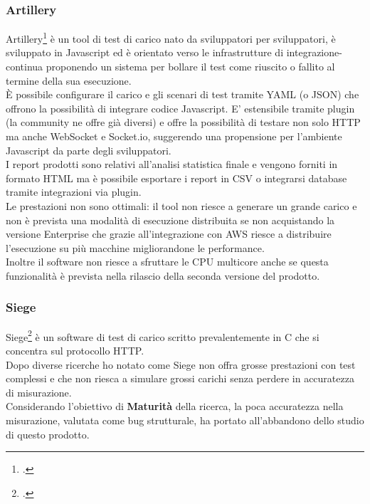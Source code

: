 \subsubsection{Artillery}
Artillery\footcite{site:artillery} è un tool di test di carico nato da sviluppatori per sviluppatori, è sviluppato in Javascript ed è orientato verso le infrastrutture di \gls{integrazione-continua} proponendo un sistema per bollare il test come riuscito o fallito al termine della sua esecuzione. \\
È possibile configurare il carico e gli scenari di test tramite YAML (o JSON) che offrono la possibilità di integrare codice Javascript.
E’ estensibile tramite \gls{plugin} (la community ne offre già diversi) e offre la possibilità di testare non solo HTTP ma anche WebSocket e Socket.io, suggerendo una propensione per l’ambiente Javascript da parte degli sviluppatori. \\
I report prodotti sono relativi all’analisi statistica finale e vengono forniti in formato HTML ma è possibile esportare i report in CSV o integrarsi database tramite integrazioni via \gls{plugin}. \\
Le prestazioni non sono ottimali: il tool non riesce a generare un grande carico e non è prevista una modalità di esecuzione distribuita se non acquistando la versione Enterprise che grazie all’integrazione con AWS riesce a distribuire l’esecuzione su più macchine migliorandone le performance. \\
Inoltre il software non riesce a sfruttare le CPU multicore anche se questa funzionalità è prevista nella rilascio della seconda versione del prodotto.
\subsubsection{Siege}
Siege\footcite{site:siege} è un software di test di carico scritto prevalentemente in C che si concentra sul protocollo HTTP.\\
Dopo diverse ricerche ho notato come Siege non offra grosse prestazioni con test complessi e che non riesca a simulare grossi carichi senza perdere in accuratezza di misurazione.\\
Considerando l'obiettivo di \textbf{Maturità} della ricerca, la poca accuratezza nella misurazione, valutata come bug strutturale, ha portato all'abbandono dello studio di questo prodotto.
